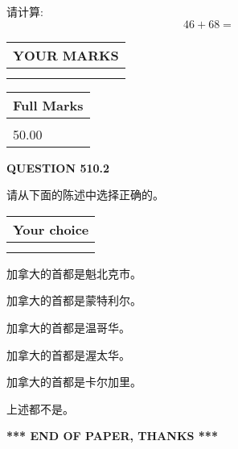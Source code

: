 \documentclass{ctexart}
\begin{document}
  
 
请计算:
\begin{equation}
46 +  %
68 = \nonumber
\end{equation}
 

 

 
  
\vspace{0.2in}
  
\noindent\begin{tabular}{|l|}
\hline
 YOUR MARKS  \\
\hline
 \\ 
 \\ 
\hline
\end{tabular}
\hspace{0.05in} \begin{tabular}{|l|}
\hline
 Full Marks  \\
\hline
 \\ 
50.00 \\
\hline
\end{tabular}
{\textbf{\Large{QUESTION
510.2 
}}}
  
  
请从下面的陈述中选择正确的。
  
  
\noindent\hspace{3.0in} \begin{tabular}{|l|}
\hline
Your choice \\
\hline
 \\ 
 \\ 
\hline
\end{tabular}
  
  
 
 
加拿大的首都是魁北克市。
 
 
加拿大的首都是蒙特利尔。
 
 
加拿大的首都是温哥华。
 
 
加拿大的首都是渥太华。
 
 
加拿大的首都是卡尔加里。
 
 
 上述都不是。
 
 
   
   
 \vspace{0.2in}
 
   
   
   
   
\vspace{1.0in} 
{\textbf{\large{ *** END OF PAPER, THANKS *** }}} 
   
\end{document}
